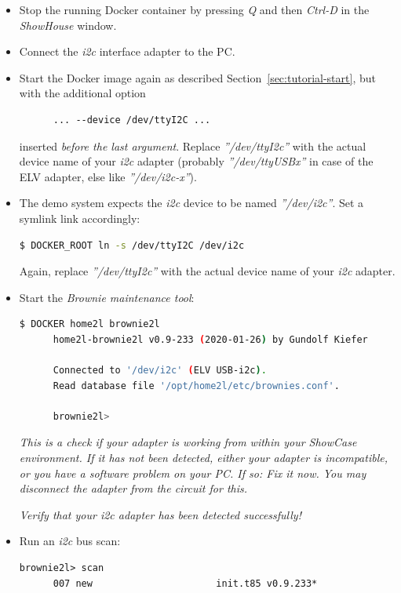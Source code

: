 \documentclass[12pt,english,parskip=half,headheight=19pt]{scrreprt}
\begin{document}
\begin{itemize}[$\blacktriangleright$]
  \item
    Stop the running Docker container by pressing \textit{Q} and then \textit{Ctrl-D} in the \textit{ShowHouse} window.
    
  \item
    Connect the \textit{i2c} interface adapter to the PC.

  \item
    Start the Docker image again as described Section~\ref{sec:tutorial-start},
    but with the additional option
    \begin{lstlisting}
      ... --device /dev/ttyI2C ...
    \end{lstlisting}
    inserted \textit{before the last argument}. Replace \textit{''/dev/ttyI2c''} with the actual
    device name of your \textit{i2c} adapter (probably \textit{''/dev/ttyUSBx''} in case of the ELV
    adapter, else like \textit{''/dev/i2c-x''}).

  \item
    The demo system expects the \textit{i2c} device to be named \textit{''/dev/i2c''}.
    Set a symlink link accordingly:
    \begin{lstlisting}[language=bash]
      $ DOCKER_ROOT ln -s /dev/ttyI2C /dev/i2c
    \end{lstlisting}
    Again, replace \textit{''/dev/ttyI2c''} with the actual device name of your \textit{i2c} adapter.

  \item
    Start the \textit{Brownie maintenance tool}:
    \begin{lstlisting}[language=bash]
      $ DOCKER home2l brownie2l
      home2l-brownie2l v0.9-233 (2020-01-26) by Gundolf Kiefer

      Connected to '/dev/i2c' (ELV USB-i2c).
      Read database file '/opt/home2l/etc/brownies.conf'.

      brownie2l>
    \end{lstlisting}

    \textit{This is a check if your adapter is working from within your ShowCase environment.
    If it has not been detected, either your adapter is incompatible, or you have a software
    problem on your PC. If so: Fix it now. You may disconnect the adapter from the circuit for this.}

    \textit{Verify that your \textit{i2c} adapter has been detected successfully!}

  \item
    Run an \textit{i2c} bus scan:
    \begin{lstlisting}[language=brownie2l]
      brownie2l> scan
      007 new                      init.t85 v0.9.233*
    \end{lstlisting}


\end{itemize}
\end{document}
